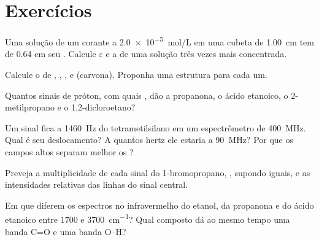 \section{Exercícios}

\begin{exercise}[$\star$]\label{exo:b1:structure-spectroscopy:1}
Uma solução de um corante a \qty{2.0e-5}{mol/L} em uma cubeta de
\qty{1.00}{cm} tem  de 0.64 em seu . Calcule
$\varepsilon$ e a  de uma solução três vezes mais
concentrada.
\end{exercise}

\begin{exercise}[$\star$]\label{exo:b1:structure-spectroscopy:2}
Calcule o  de , , ,
 e  (carvona). Proponha uma estrutura para cada um.
\end{exercise}

\begin{exercise}[$\star$]\label{exo:b1:structure-spectroscopy:3}
Quantos sinais de próton, com quais , dão a propanona, o
ácido etanoico, o 2-metilpropano e o 1,2-dicloroetano?
\end{exercise}

\begin{exercise}[$\star$]\label{exo:b1:structure-spectroscopy:4}
Um sinal fica a \qty{1460}{Hz} do tetrametilsilano em um espectrômetro
de \qty{400}{MHz}. Qual é seu deslocamento? A quantos hertz ele estaria a
\qty{90}{MHz}? Por que os campos altos separam melhor os ?
\end{exercise}

\begin{exercise}[$\star\star$]\label{exo:b1:structure-spectroscopy:5}
Preveja a multiplicidade de cada sinal do 1-bromopropano,
, supondo  iguais, e as
intensidades relativas das linhas do sinal central.
\end{exercise}

\begin{exercise}[$\star\star$]\label{exo:b1:structure-spectroscopy:6}
Em que diferem os espectros no infravermelho do etanol, da propanona e do
ácido etanoico entre 1700 e \qty{3700}{cm^{-1}}? Qual composto dá ao
mesmo tempo uma banda C=O e uma banda O--H?
\end{exercise}

